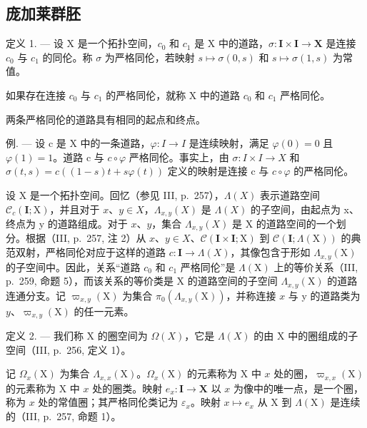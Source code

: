 \subsection{庞加莱群胚}

定义 1. --- 设 X 是一个拓扑空间，\(c_{0}\) 和 \(c_{1}\) 是 X 中的道路，\(\sigma\colon\mathbf{I}\times\mathbf{I}\to\mathbf{X}\) 是连接 \(c_{0}\) 与 \(c_{1}\) 的同伦。称 \(\sigma\) 为严格同伦，若映射 \(s\mapsto\sigma(0,s)\) 和 \(s\mapsto\sigma(1,s)\) 为常值。

如果存在连接 \(c_{0}\) 与 \(c_{1}\) 的严格同伦，就称 X 中的道路 \(c_{0}\) 和 \(c_{1}\) 严格同伦。

两条严格同伦的道路具有相同的起点和终点。

例. --- 设 c 是 X 中的一条道路，\(\varphi\colon I\to I\) 是连续映射，满足 \(\varphi(0)=0\) 且 \(\varphi(1)=1\)。道路 c 与 \(c\circ\varphi\) 严格同伦。事实上，由 \(\sigma\colon I\times I\to X\) 和 \(\sigma(t,s)=c((1-s)t+s\varphi(t))\) 定义的映射是连接 c 与 \(c\circ\varphi\) 的严格同伦。

设 X 是一个拓扑空间。回忆（参见 III, p.~257），\(\Lambda(X)\) 表示道路空间 \(\mathcal{C}_c(\mathbf{I};\mathrm{X})\)，并且对于 \(x\)、\(y \in X\)，\(\Lambda_{x,y}(X)\) 是 \(\Lambda(X)\) 的子空间，由起点为 x、终点为 y 的道路组成。对于 \(x\)、\(y\)，集合 \(\Lambda_{x,y}(X)\) 是 X 的道路空间的一个划分。根据（III, p.~257, 注 2）从 \(x\)、\(y \in X\)、\(\mathcal{C}(\mathbf{I} \times \mathbf{I};\mathrm{X})\) 到 \(\mathcal{C}(\mathbf{I};\Lambda(\mathrm{X}))\) 的典范双射，严格同伦对应于这样的道路 \(c: \mathbf{I} \to \Lambda(X)\)，其像包含于形如 \(\Lambda_{x,y}(\mathrm{X})\) 的子空间中。因此，关系“道路 \(c_0\) 和 \(c_1\) 严格同伦”是 \(\Lambda(\mathrm{X})\) 上的等价关系（III, p.~259, 命题 5），而该关系的等价类是 X 的道路空间的子空间 \(\Lambda_{x,y}(\mathrm{X})\) 的道路连通分支。记 \(\varpi_{x,y}(\mathrm{X})\) 为集合 \(\pi_0(\Lambda_{x,y}(\mathrm{X}))\)，并称连接 \(x\) 与 y 的道路类为 \(y\)、\(\varpi_{x,y}(\mathrm{X})\) 的任一元素。

定义 2. --- 我们称 X 的圈空间为 \(\Omega(X)\)，它是 \(\Lambda(X)\) 的由 X 中的圈组成的子空间（III, p.~256, 定义 1）。

记 \(\Omega_x(\mathrm{X})\) 为集合 \(\Lambda_{x,x}(\mathrm{X})\)。\(\Omega_x(\mathrm{X})\) 的元素称为 X 中 \(x\) 处的圈，\(\varpi_{x,x}(\mathrm{X})\) 的元素称为 X 中 \(x\) 处的圈类。映射 \(e_x: \mathbf{I} \to \mathbf{X}\) 以 \(x\) 为像中的唯一点，是一个圈，称为 \(x\) 处的常值圈；其严格同伦类记为 \(\varepsilon_x\)。映射 \(x \mapsto e_x\) 从 X 到 \(\Lambda(\mathrm{X})\) 是连续的（III, p.~257, 命题 1）。

